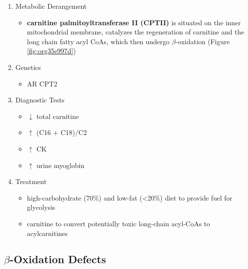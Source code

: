 \documentclass[12pt]{scrartcl}
\begin{document}
\begin{enumerate}
\item Metabolic Derangement
\label{sec:org716b5de}
\begin{itemize}
\item \textbf{carnitine palmitoyltransferase II (CPTII)} is situated on the inner
mitochondrial membrane, catalyzes the regeneration of carnitine and
the long chain fatty acyl CoAs, which then undergo \(\beta\)-oxidation
(Figure \ref{fig:org35e997d})
\end{itemize}
\item Genetics
\label{sec:orgcfffcfb}
\begin{itemize}
\item AR CPT2
\end{itemize}
\item Diagnostic Tests
\label{sec:org233953a}
\begin{itemize}
\item \(\downarrow\) total carnitine
\item \(\uparrow\) (C16 + C18)/C2
\item \(\uparrow\) CK
\item \(\uparrow\) urine myoglobin
\end{itemize}
\item Treatment
\label{sec:org99fc111}
\begin{itemize}
\item high-carbohydrate (70\%) and low-fat (<20\%) diet to provide fuel for glycolysis
\item carnitine to convert potentially toxic long-chain acyl-CoAs to
acylcarnitines
\end{itemize}
\end{enumerate}
\subsection{\(\beta\)-Oxidation Defects}
\label{sec:orgd0e72a5}
\end{document}
